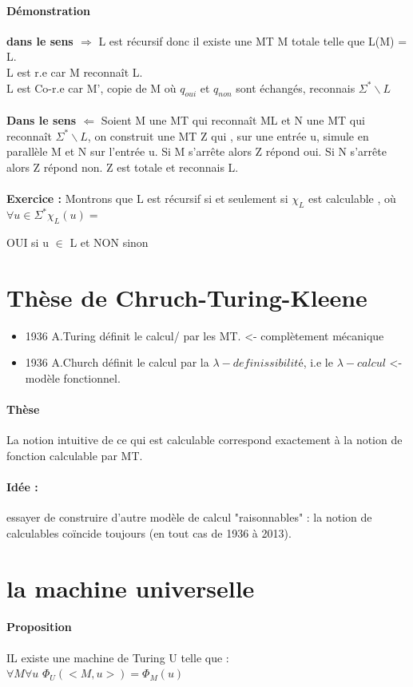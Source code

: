\documentclass{article}
\begin{document}
\paragraph{Démonstration} \textbf{dans le sens $\Rightarrow$ }L est récursif donc il existe une MT M totale telle que L(M) = L.\\L est r.e car M reconnaît L.\\ L est Co-r.e car M', copie de M où $q_{oui}$ et $q_{non}$ sont échangés, reconnais $\Sigma^{*}\backslash L$\\\\
\textbf{Dans le sens $\Leftarrow$ } Soient M une MT qui reconnaît ML et N une MT qui reconnaît $\Sigma^{*}\backslash L$, on construit une MT Z qui , sur une entrée u, simule en parallèle M et N sur l'entrée u. Si M s’arrête alors Z répond oui. Si N s’arrête alors Z répond non. Z est totale et reconnais L.\\\\\textbf{Exercice : } Montrons que L est récursif si et seulement si $\chi_{L}$ est calculable , où $\forall u \in \Sigma^{*} \chi_{L}(u) = ${OUI si u $\in$ L et NON sinon
\section{Thèse de Chruch-Turing-Kleene}
\begin{itemize}
\item 1936 A.Turing définit le calcul/ par les MT. <- complètement mécanique
\item 1936 A.Church définit le calcul par la $\lambda-definissibilité$, i.e le $\lambda-calcul$ <- modèle fonctionnel.
\end{itemize}
\paragraph{Thèse} La notion intuitive de ce qui est calculable correspond exactement à la notion de fonction calculable par MT.
\paragraph{Idée : } essayer de construire d'autre modèle de calcul "raisonnables" : la notion de calculables coïncide toujours (en tout cas de  1936 à 2013).
\section{la machine universelle} 
\paragraph{Proposition} IL existe une machine de Turing U telle que :\\ $\forall M\forall u$  $\Phi_{U}(<M,u>) = \Phi_{M}(u)$ 
}
\end{document}
